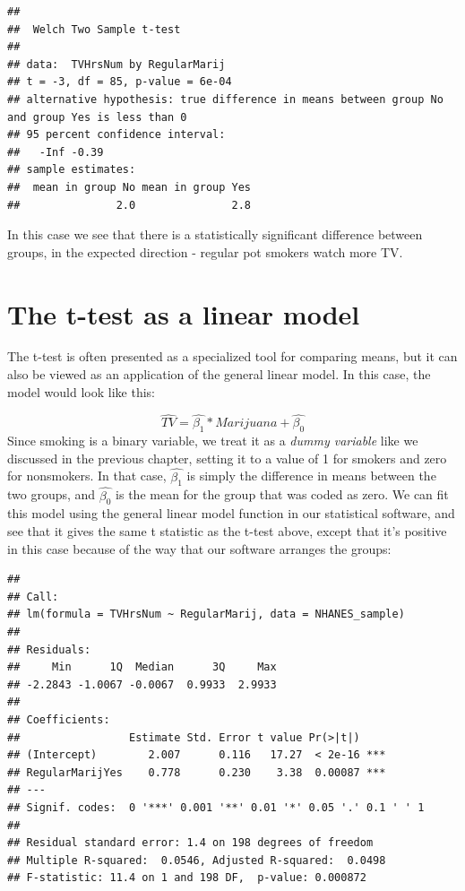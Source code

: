 \documentclass[
  12pt,
]{book}
\begin{document}
\begin{verbatim}
## 
##  Welch Two Sample t-test
## 
## data:  TVHrsNum by RegularMarij
## t = -3, df = 85, p-value = 6e-04
## alternative hypothesis: true difference in means between group No and group Yes is less than 0
## 95 percent confidence interval:
##   -Inf -0.39
## sample estimates:
##  mean in group No mean in group Yes 
##               2.0               2.8
\end{verbatim}

In this case we see that there is a statistically significant difference between groups, in the expected direction - regular pot smokers watch more TV.

\hypertarget{ttest-linear-model}{%
\section{The t-test as a linear model}\label{ttest-linear-model}}

The t-test is often presented as a specialized tool for comparing means, but it can also be viewed as an application of the general linear model. In this case, the model would look like this:

\[
\hat{TV} = \hat{\beta_1}*Marijuana + \hat{\beta_0}
\]
Since smoking is a binary variable, we treat it as a \emph{dummy variable} like we discussed in the previous chapter, setting it to a value of 1 for smokers and zero for nonsmokers. In that case, \(\hat{\beta_1}\) is simply the difference in means between the two groups, and \(\hat{\beta_0}\) is the mean for the group that was coded as zero. We can fit this model using the general linear model function in our statistical software, and see that it gives the same t statistic as the t-test above, except that it's positive in this case because of the way that our software arranges the groups:

\begin{verbatim}
## 
## Call:
## lm(formula = TVHrsNum ~ RegularMarij, data = NHANES_sample)
## 
## Residuals:
##     Min      1Q  Median      3Q     Max 
## -2.2843 -1.0067 -0.0067  0.9933  2.9933 
## 
## Coefficients:
##                 Estimate Std. Error t value Pr(>|t|)    
## (Intercept)        2.007      0.116   17.27  < 2e-16 ***
## RegularMarijYes    0.778      0.230    3.38  0.00087 ***
## ---
## Signif. codes:  0 '***' 0.001 '**' 0.01 '*' 0.05 '.' 0.1 ' ' 1
## 
## Residual standard error: 1.4 on 198 degrees of freedom
## Multiple R-squared:  0.0546, Adjusted R-squared:  0.0498 
## F-statistic: 11.4 on 1 and 198 DF,  p-value: 0.000872
\end{verbatim}
\end{document}

